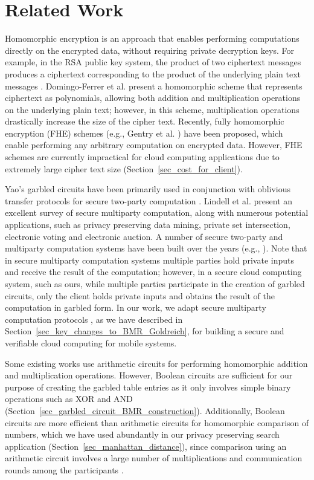 \documentclass[10pt,journal,cspaper,compsoc]{IEEEtran}
\begin{document}
 \section{Related Work}
\label{sec_related_work}

Homomorphic encryption is an approach that enables performing computations directly on the encrypted data, without requiring private decryption keys. For example, in the RSA public key system, the product of two ciphertext messages produces a ciphertext corresponding to the product of the underlying plain text messages \cite{rivest78}. Domingo-Ferrer et al. \cite{domingoFerrer02} present a homomorphic scheme that represents ciphertext as polynomials, allowing both addition and multiplication operations on the underlying plain text; however, in this scheme, multiplication operations drastically increase the size of the cipher text. Recently, fully homomorphic encryption (FHE) schemes (e.g., Gentry et al. \cite{gentry10}) have been proposed, which enable performing any arbitrary computation on encrypted data. However, FHE schemes are currently impractical for cloud computing applications due to extremely large cipher text size (Section~\ref{sec_cost_for_client}).


Yao's garbled circuits have been primarily used in conjunction with oblivious transfer protocols for secure two-party computation \cite{yao82,yao86,lindell09}. Lindell et al. \cite{lindell_survey09} present an excellent survey of secure multiparty computation, along with numerous potential applications, such as privacy preserving data mining, private set intersection, electronic voting and electronic auction. A number of secure two-party and multiparty computation systems have been built over the years (e.g., \cite{henecka10,malkhi04,david08}). Note that in secure multiparty computation systems multiple parties hold private inputs and receive the result of the computation; however, in a secure cloud computing system, such as ours, while multiple parties participate in the creation of garbled circuits, only the client holds private inputs and obtains the result of the computation in garbled form. In our work, we adapt secure multiparty computation protocols \cite{goldreich04,goldreich87,beaver90,rogaway91}, as we have described in Section~\ref{sec_key_changes_to_BMR_Goldreich}, for building a secure and verifiable cloud computing for mobile systems.


Some existing works \cite{burkhart10,damgaard12} use arithmetic circuits for performing homomorphic addition and multiplication operations. However, Boolean circuits are sufficient for our purpose of creating the garbled table entries as it only involves simple binary operations such as XOR and AND (Section~\ref{sec_garbled_circuit_BMR_construction}). Additionally, Boolean circuits are more efficient than arithmetic circuits for homomorphic comparison of numbers, which we have used abundantly in our privacy preserving search application (Section~\ref{sec_manhattan_distance}), since comparison using an arithmetic circuit involves a large number of multiplications and communication rounds among the participants \cite{burkhart10,damgaard12}.
\end{document}
